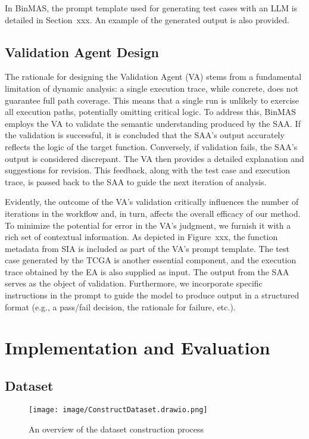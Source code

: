 \documentclass[acmsmall,screen,review,anonymous]{acmart} %
\begin{document}
In BinMAS, the prompt template used for generating test cases with an LLM is detailed in Section~xxx. An example of the generated output is also provided.

\subsection{Validation Agent Design}

The rationale for designing the Validation Agent (VA) stems from a fundamental limitation of dynamic analysis: a single execution trace, while concrete, does not guarantee full path coverage. This means that a single run is unlikely to exercise all execution paths, potentially omitting critical logic. To address this, BinMAS employs the VA to validate the semantic understanding produced by the SAA. If the validation is successful, it is concluded that the SAA's output accurately reflects the logic of the target function. Conversely, if validation fails, the SAA's output is considered discrepant. The VA then provides a detailed explanation and suggestions for revision. This feedback, along with the test case and execution trace, is passed back to the SAA to guide the next iteration of analysis.

Evidently, the outcome of the VA's validation critically influences the number of iterations in the workflow and, in turn, affects the overall efficacy of our method. To minimize the potential for error in the VA's judgment, we furnish it with a rich set of contextual information. As depicted in Figure~xxx, the function metadata from SIA is included as part of the VA's prompt template. The test case generated by the TCGA is another essential component, and the execution trace obtained by the EA is also supplied as input. The output from the SAA serves as the object of validation. Furthermore, we incorporate specific instructions in the prompt to guide the model to produce output in a structured format (e.g., a pass/fail decision, the rationale for failure, etc.).



\section{Implementation and Evaluation}

\subsection{Dataset}
\begin{figure}[h] %
    \centering
    \texttt{[image: image/ConstructDataset.drawio.png]} %
    \caption{An overview of the dataset construction process} %
    \label{fig:construct-dataset} %
\end{figure}
\end{document}
